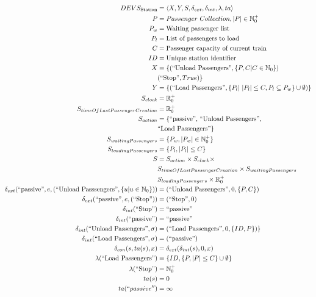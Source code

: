\begin{align*}
DEVS_{\textrm{Station}} &= \left<X,Y,S,\delta_{ext},\delta_{int},\lambda,ta\right> \\
P &= Passenger\ Collection, |P|\in\mathbb{N}_0^+ \\
P_w &= \text{Waiting passenger list} \\
P_l &= \text{List of passengers to load} \\
C &= \text{Passenger capacity of current train} \\
ID &= \text{Unique station identifier} \\
X &= \lbrace(\text{``Unload Passengers''},\lbrace P, C|C\in\mathbb{N}_0\rbrace) \\
 & (\text{``Stop''},True)\rbrace \\
Y &= \lbrace(\text{``Load Passengers''},\lbrace P_l|\ |P_l|\leq C, P_l\subseteq P_w\rbrace\cup\emptyset)\rbrace \\
S_{clock} &= \mathbb{R}_0^+ \\ 
S_{timeOfLastPassengerCreation} &= \mathbb{R}_0^+ \\
S_{action} &= \lbrace\text{``passive'', ``Unload Passengers'',} \\
	& \text{``Load Passengers''}\rbrace \\
S_{waitingPassengers} &= \lbrace P_w, |P_w|\in\mathbb{N}_0^+\rbrace \\
S_{loadingPassengers} &= \lbrace P_l, |P_l|\leq C\rbrace \\ 
S &= S_{action}\times S_{clock}\times \\
 & S_{timeOfLastPassengerCreation}\times S_{waitingPassengers} \\
 & S_{loadingPassengers}\times \mathbb{R}_0^+ \\
\delta_{ext}(\text{``passive''},e,(\text{``Unload Passsengers''},\lbrace u|u\in\mathbb{N}_0\rbrace)) &= (\text{``Unload Passengers''},0,\lbrace P, C\rbrace) \\
\delta_{ext}(\text{``passive''},e,(\text{``Stop''})) &= (\text{``Stop''},0) \\
\delta_{int}(\text{``Stop''}) &= \text{``passive''} \\
\delta_{int}(\text{``passive''}) &= \text{``passive''} \\
\delta_{int}(\text{``Unload Passengers''},\sigma) &= (\text{``Load Passengers''},0,\lbrace ID, P\rbrace)\rbrace\ \\
\delta_{int}(\text{``Load Passengers''},\sigma) &= (\text{``passive''}) \\
\delta_{con}(s,ta(s),x) &= \delta_{ext}(\delta_{int}(s),0,x) \\
\lambda(\text{``Load Passengers''}) &= \lbrace ID,\lbrace P, |P|\leq C\rbrace\cup\emptyset\rbrace \\
\lambda(\text{``Stop''}) &= \mathbb{N}_0^+ \\
ta(s) &= 0 \\
ta(``passive'') &= \infty \\
\end{align*}
%
